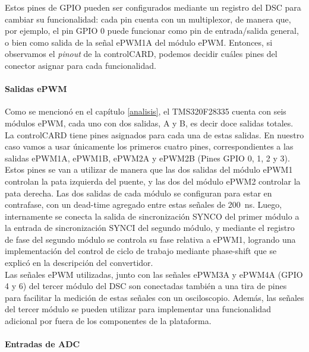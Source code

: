 Estos pines de GPIO pueden ser configurados mediante un registro del DSC para cambiar su funcionalidad: cada pin cuenta con un multiplexor, de manera que, por ejemplo, el pin GPIO 0 puede funcionar como pin de entrada/salida general, o bien como salida de la señal ePWM1A del módulo ePWM. Entonces, si observamos el \textit{pinout} de la controlCARD, podemos decidir cuáles pines del conector asignar para cada funcionalidad.\\

\paragraph{Salidas ePWM}

Como se mencionó en el capítulo \ref{analisis}, el TMS320F28335 cuenta con seis módulos ePWM, cada uno con dos salidas, A y B, es decir doce salidas totales. La controlCARD tiene pines asignados para cada una de estas salidas. En nuestro caso vamos a usar únicamente los primeros cuatro pines, correspondientes a las salidas ePWM1A, ePWM1B, ePWM2A y ePWM2B (Pines GPIO 0, 1, 2 y 3).\\

Estos pines se van a utilizar de manera que las dos salidas del módulo ePWM1 controlan la pata izquierda del puente, y las dos del módulo ePWM2 controlar la pata derecha. Las dos salidas de cada módulo se configuran para estar en contrafase, con un dead-time agregado entre estas señales de \SI[]{200}{\nano\second}. Luego, internamente se conecta la salida de sincronización SYNCO del primer módulo a la entrada de sincronización SYNCI del segundo módulo, y mediante el registro de fase del segundo módulo se controla su fase relativa a ePWM1, logrando una implementación del control de ciclo de trabajo mediante phase-shift que se explicó en la descripción del convertidor.\\

Las señales ePWM utilizadas, junto con las señales ePWM3A y ePWM4A (GPIO 4 y 6) del tercer módulo del DSC son conectadas también a una tira de pines para facilitar la medición de estas señales con un osciloscopio. Además, las señales del tercer módulo se pueden utilizar para implementar una funcionalidad adicional por fuera de los componentes de la plataforma.\\

\paragraph{Entradas de ADC}

